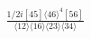 \documentclass[varwidth, border=5pt]{standalone}
\begin{document}
\begin{my}
$\begin{gathered}
\scriptscriptstyle\frac{1/2i[45]\langle46\rangle^4[56]}{\langle12\rangle\langle16\rangle\langle23\rangle\langle34\rangle}
\end{gathered}$
\end{my}
\end{document}

